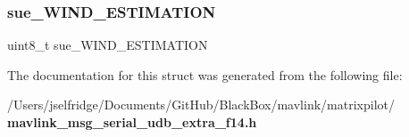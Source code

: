 \subsubsection{sue\+\_\+\+W\+I\+N\+D\+\_\+\+E\+S\+T\+I\+M\+A\+T\+I\+ON}
{\footnotesize\ttfamily uint8\+\_\+t sue\+\_\+\+W\+I\+N\+D\+\_\+\+E\+S\+T\+I\+M\+A\+T\+I\+ON}



The documentation for this struct was generated from the following file\+:\begin{DoxyCompactItemize}
\item 
/\+Users/jselfridge/\+Documents/\+Git\+Hub/\+Black\+Box/mavlink/matrixpilot/\textbf{ mavlink\+\_\+msg\+\_\+serial\+\_\+udb\+\_\+extra\+\_\+f14.\+h}\end{DoxyCompactItemize}
